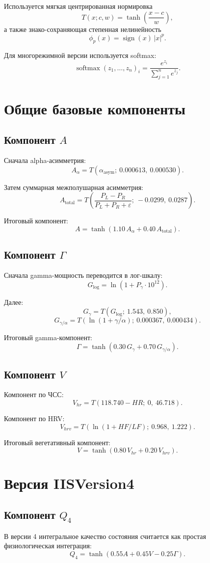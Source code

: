 \documentclass[12pt,a4paper]{article}
\begin{document}
Используется мягкая центрированная нормировка
\[
T(x;c,w)=\tanh\!\left(\frac{x-c}{w}\right),
\]
а также знако-сохраняющая степенная нелинейность
\[
\phi_p(x)=\operatorname{sign}(x)\,|x|^p.
\]

Для многорежимной версии используется softmax:
\[
\operatorname{softmax}(z_1,\dots,z_n)_i=
\frac{e^{z_i}}{\sum_{j=1}^{n}e^{z_j}}.
\]

\section{Общие базовые компоненты}
\subsection{Компонент \(A\)}
Сначала alpha-асимметрия:
\[
A_{\alpha}=T(\alpha_{\mathrm{asym}};\ 0.000613,\ 0.000530).
\]

Затем суммарная межполушарная асимметрия:
\[
A_{\mathrm{total}}=
T\!\left(
\frac{P_L-P_R}{P_L+P_R+\varepsilon};\
-0.0299,\ 0.0287
\right).
\]

Итоговый компонент:
\[
A=\tanh\!\left(1.10\,A_{\alpha}+0.40\,A_{\mathrm{total}}\right).
\]

\subsection{Компонент \(\Gamma\)}
Сначала gamma-мощность переводится в лог-шкалу:
\[
G_{\log}=\ln(1+P_\gamma\cdot 10^{12}).
\]

Далее:
\[
G_{\gamma}=T(G_{\log};\ 1.543,\ 0.850),
\]
\[
G_{\gamma/\alpha}=T(\ln(1+\gamma/\alpha);\ 0.000367,\ 0.000434).
\]

Итоговый gamma-компонент:
\[
\Gamma=\tanh\!\left(0.30\,G_{\gamma}+0.70\,G_{\gamma/\alpha}\right).
\]

\subsection{Компонент \(V\)}
Компонент по ЧСС:
\[
V_{hr}=T(118.740-HR;\ 0,\ 46.718).
\]

Компонент по HRV:
\[
V_{hrv}=T(\ln(1+HF/LF);\ 0.968,\ 1.222).
\]

Итоговый вегетативный компонент:
\[
V=\tanh\!\left(0.80\,V_{hr}+0.20\,V_{hrv}\right).
\]

\section{Версия IISVersion4}
\subsection{Компонент \(Q_4\)}
В версии 4 интегральное качество состояния считается как простая физиологическая интеграция:
\[
Q_4=\tanh\!\left(0.55A+0.45V-0.25\Gamma\right).
\]
\end{document}
